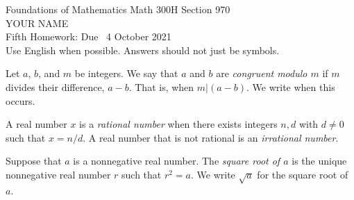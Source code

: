 \documentclass[12pt]{article}
\newcommand{\defcolor}[1]{{\color{blue}{#1}}}
\newcommand{\demph}[1]{{\color{blue}\sl{#1}}}
\begin{document}
\LARGE 
\noindent
{\color{Maroon}Foundations of Mathematics \hfill Math 300H Section 970}\vspace{2pt}\\
\Large YOUR NAME\vspace{2pt}\\
\large
Fifth Homework: \hfill Due \  4 October 2021\\
Use English when possible.  Answers should not just be symbols.
\normalsize\medskip



\noindent{\color{blue}\rule{500pt}{2pt}}\medskip



  Let $a$, $b$, and $m$ be integers.
We say that $a$ and $b$ are \demph{congruent modulo $m$} if $m$ divides their difference, $a-b$.
That is, when $m|(a-b)$.
We write \defcolor{$a\equiv b\mod m$} when this occurs.

A real number $x$ is a \demph{rational number} when there exists integers $n,d$ with $d\neq 0$ such that  $x=n/d$.
  A real number that is not rational is an \demph{irrational number}.


Suppose that $a$ is a nonnegative real number.
The \demph{square root of $a$} is the unique nonnegative real number $r$ such that $r^2=a$.
We write \demph{$\sqrt{a}$} for the square root of $a$.



\noindent{\color{blue}\rule{500pt}{2pt}}\smallskip
\end{document}
